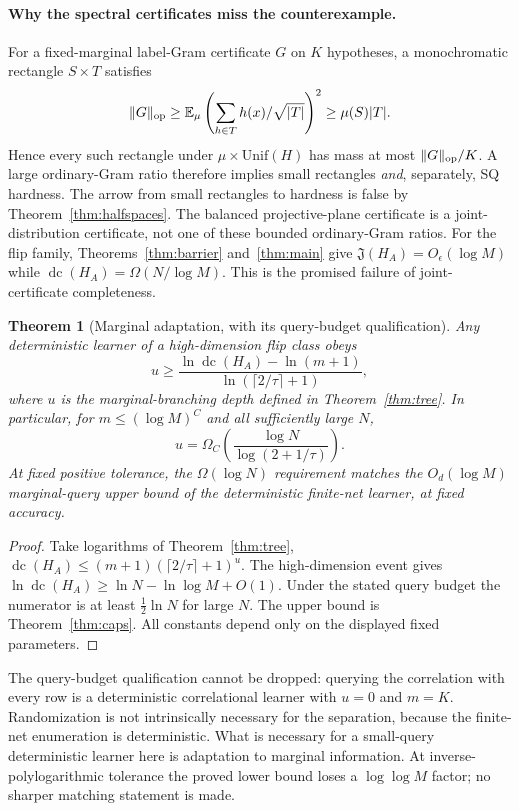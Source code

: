 \documentclass[11pt]{article}
\newtheorem{theorem}{Theorem}
\DeclareMathOperator{\dc}{dc}
\newcommand{\E}{\mathbb E}
\newcommand{\1}{\mathbf 1}
\begin{document}
\paragraph{Why the spectral certificates miss the counterexample.}
For a fixed-marginal label-Gram certificate $G$ on $K$ hypotheses, a monochromatic rectangle $S\times T$ satisfies
\[
 \|G\|_{\rm op}\ge\E_\mu\left(\sum_{h\in T}h(x)/\sqrt{|T|}\right)^2
 \ge\mu(S)|T|.
\]
Hence every such rectangle under $\mu\times\mathrm{Unif}(H)$ has mass at most $\|G\|_{\rm op}/K$. A large ordinary-Gram ratio therefore implies small rectangles \emph{and}, separately, SQ hardness. The arrow from small rectangles to hardness is false by Theorem~\ref{thm:halfspaces}. The balanced projective-plane certificate is a joint-distribution certificate, not one of these bounded ordinary-Gram ratios. For the flip family, Theorems~\ref{thm:barrier} and~\ref{thm:main} give $\mathfrak J(H_A)=O_\epsilon(\log M)$ while $\dc(H_A)=\Omega(N/\log M)$. This is the promised failure of joint-certificate completeness.

\begin{samepage}
\begin{theorem}[Marginal adaptation, with its query-budget qualification]\label{thm:adapt}
Any deterministic learner of a high-dimension flip class obeys
\[
 u\ge\frac{\ln\dc(H_A)-\ln(m+1)}
 {\ln(\lceil2/\tau\rceil+1)},
\]
where $u$ is the marginal-branching depth defined in Theorem~\ref{thm:tree}. In particular, for $m\le(\log M)^C$ and all sufficiently large $N$,
\[
 u=\Omega_C\!\left(\frac{\log N}{\log(2+1/\tau)}\right).
\]
At fixed positive tolerance, the $\Omega(\log N)$ requirement matches the $O_d(\log M)$ marginal-query upper bound of the deterministic finite-net learner, at fixed accuracy.
\end{theorem}
\end{samepage}
\begin{proof}
Take logarithms of Theorem~\ref{thm:tree}, $\dc(H_A)\le(m+1)(\lceil2/\tau\rceil+1)^u$. The high-dimension event gives $\ln\dc(H_A)\ge\ln N-\ln\log M+O(1)$. Under the stated query budget the numerator is at least $\tfrac12\ln N$ for large $N$. The upper bound is Theorem~\ref{thm:caps}. All constants depend only on the displayed fixed parameters.
\end{proof}

The query-budget qualification cannot be dropped: querying the correlation with every row is a deterministic correlational learner with $u=0$ and $m=K$. Randomization is not intrinsically necessary for the separation, because the finite-net enumeration is deterministic. What is necessary for a small-query deterministic learner here is adaptation to marginal information. At inverse-polylogarithmic tolerance the proved lower bound loses a $\log\log M$ factor; no sharper matching statement is made.
\end{document}
